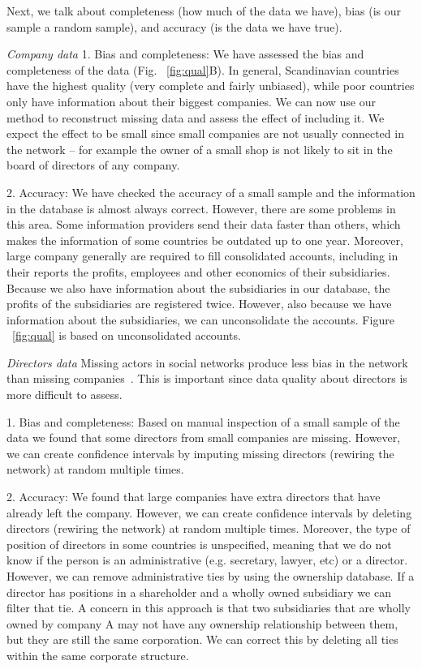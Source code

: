 Next, we talk about completeness (how much of the data we have), 
bias (is our sample a random sample), 
and accuracy (is the data we have true). 

\textit{Company data}
1. Bias and completeness: 
We have assessed the bias and completeness of the data (Fig. ~\ref{fig:qual}B). 
In general, Scandinavian countries have the highest quality (very complete and fairly unbiased), 
while poor countries only have information about their biggest companies.
We can now use our method to reconstruct missing data and assess the effect of including it. 
We expect the effect to be small since small companies are not usually connected in the network -- for example the owner of a small shop is not likely to sit in the board of directors of any company.

2.  Accuracy: 
We have checked the accuracy of a small sample and the information in the database is almost always correct. 
However, there are some problems in this area. 
Some information providers send their data faster than others, which makes the information of some countries be outdated up to one year. 
Moreover, large company generally are required to fill consolidated accounts, 
including in their reports the profits, employees and other economics of their subsidiaries. 
Because we also have information about the subsidiaries in our database, 
the profits of the subsidiaries are registered twice.
However, also because we have information about the subsidiaries,
we can unconsolidate the accounts.
Figure ~\ref{fig:qual} is based on unconsolidated accounts.

\textit{Directors data}
Missing actors in social networks produce less bias in the network than missing companies~\citep{Kossinets2006}.
This is important since data quality about directors is more difficult to assess.

1. Bias and completeness: 
Based on manual inspection of a small sample of the data we found that some directors from small companies are missing. 
However, we can create confidence intervals by imputing missing directors (rewiring the network) at random multiple times.

2.  Accuracy: 
We found that large companies have extra directors that have already left the company. 
However, we can create confidence intervals by deleting directors (rewiring the network) at random multiple times.
Moreover, the type of position of directors in some countries is unspecified, 
meaning that we do not know if the person is an administrative (e.g. secretary, lawyer, etc) or a director.
However, we can remove administrative ties by using the ownership database. 
If a director has positions in a shareholder and a wholly owned subsidiary we can filter that tie. 
A concern in this approach is that two subsidiaries that are wholly owned by company A may not have any ownership relationship between them, 
but they are still the same corporation. 
We can correct this by deleting all ties within the same corporate structure.


